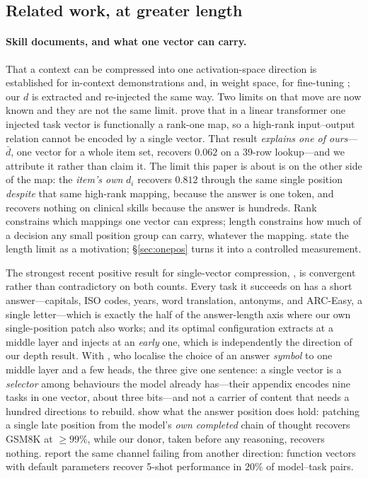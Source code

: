 \documentclass{article}
\newcommand{\dvec}{\ensuremath{d}}
\begin{document}
\subsection{Related work, at greater length}
\label{app:related2}

\paragraph{Skill documents, and what one vector can carry.}
That a context can be compressed into one activation-space direction is
established for in-context demonstrations \citep{hendel2023taskvectors,
todd2024functionvectors} and, in weight space, for fine-tuning
\citep{ilharco2023taskarithmetic}; our $\dvec$ is extracted and re-injected the
same way. Two limits on that move are now known and they are not the same limit.
\citet{dong2026taskvectorlimits} prove that in a linear transformer one injected
task vector is functionally a rank-one map, so a high-rank input--output
relation cannot be encoded by a single vector. That result \emph{explains one of
ours}---$\bar{\dvec}$, one vector for a whole item set, recovers $0.062$ on a
39-row lookup---and we attribute it rather than claim it. The limit this paper
is about is on the other side of the map: the \emph{item's own} $\dvec_i$
recovers $0.812$ through the same single position \emph{despite} that same
high-rank mapping, because the answer is one token, and recovers nothing on
clinical skills because the answer is hundreds. Rank constrains which mappings
one vector can express; length constrains how much of a decision any small
position group can carry, whatever the mapping.
\citet{dura2026sequentialpatching} state the length limit as a motivation;
\S\ref{sec:onepos} turns it into a controlled measurement.

The strongest recent positive result for single-vector compression,
\citet{ardoin2026promptcompression}, is convergent rather than contradictory on
both counts. Every task it succeeds on has a short answer---capitals, ISO codes,
years, word translation, antonyms, and ARC-Easy, a single letter---which is
exactly the half of the answer-length axis where our own single-position patch
also works; and its optimal configuration extracts at a middle layer and injects
at an \emph{early} one, which is independently the direction of our depth
result. With \citet{wiegreffe2025mcq}, who localise the choice of an answer
\emph{symbol} to one middle layer and a few heads, the three give one sentence:
a single vector is a \emph{selector} among behaviours the model already
has---their appendix encodes nine tasks in one vector, about three bits---and
not a carrier of content that needs a hundred directions to rebuild.
\citet{mehrafarin2026cothidden} show what the answer position does hold:
patching a single late position from the model's \emph{own completed} chain of
thought recovers GSM8K at $\ge99\%$, while our donor, taken before any
reasoning, recovers nothing. \citet{dasilva2025steeringoff} report the same
channel failing from another direction: function vectors with default
parameters recover 5-shot performance in $20\%$ of model--task pairs.
\end{document}

